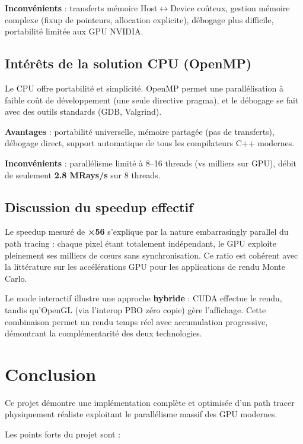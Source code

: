 \documentclass[12pt,a4paper]{article}
\begin{document}
\textbf{Inconvénients} : transferts mémoire Host$\leftrightarrow$Device coûteux, gestion mémoire
complexe (fixup de pointeurs, allocation explicite), débogage plus difficile,
portabilité limitée aux GPU NVIDIA.

\subsection{Intérêts de la solution CPU (OpenMP)}

Le CPU offre portabilité et simplicité. OpenMP permet une parallélisation
à faible coût de développement (une seule directive pragma), et le débogage
se fait avec des outils standards (GDB, Valgrind).

\textbf{Avantages} : portabilité universelle, mémoire partagée (pas de transferts),
débogage direct, support automatique de tous les compilateurs C++ modernes.

\textbf{Inconvénients} : parallélisme limité à 8--16 threads (vs milliers sur GPU),
débit de seulement \textbf{2.8 MRays/s} sur 8 threads.

\subsection{Discussion du speedup effectif}

Le speedup mesuré de \textbf{×56} s'explique par la nature embarrasingly parallel
du path tracing : chaque pixel étant totalement indépendant, le GPU exploite pleinement
ses milliers de cœurs sans synchronisation. Ce ratio est cohérent avec la littérature
sur les accélérations GPU pour les applications de rendu Monte Carlo.

Le mode interactif illustre une approche \textbf{hybride} : CUDA effectue le rendu,
tandis qu'OpenGL (via l'interop PBO zéro copie) gère l'affichage. Cette combinaison
permet un rendu temps réel avec accumulation progressive, démontrant la complémentarité
des deux technologies.

\section{Conclusion}

Ce projet démontre une implémentation complète et optimisée d'un path tracer
physiquement réaliste exploitant le parallélisme massif des GPU modernes.

Les points forts du projet sont :
\end{document}
